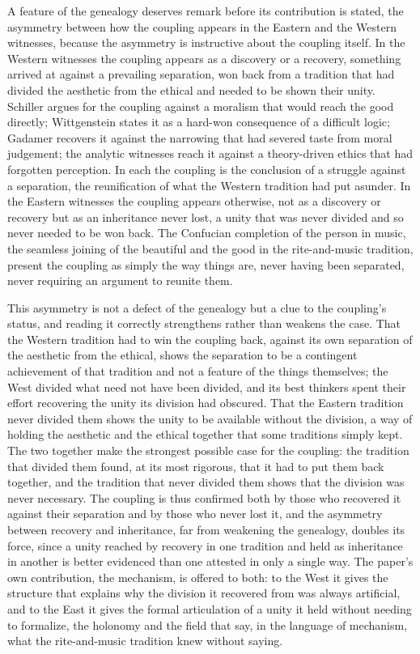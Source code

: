 A feature of the genealogy deserves remark before its contribution is stated, the asymmetry between how the coupling appears in the Eastern and the Western witnesses, because the asymmetry is instructive about the coupling itself. In the Western witnesses the coupling appears as a discovery or a recovery, something arrived at against a prevailing separation, won back from a tradition that had divided the aesthetic from the ethical and needed to be shown their unity. Schiller argues for the coupling against a moralism that would reach the good directly; Wittgenstein states it as a hard-won consequence of a difficult logic; Gadamer recovers it against the narrowing that had severed taste from moral judgement; the analytic witnesses reach it against a theory-driven ethics that had forgotten perception. In each the coupling is the conclusion of a struggle against a separation, the reunification of what the Western tradition had put asunder. In the Eastern witnesses the coupling appears otherwise, not as a discovery or recovery but as an inheritance never lost, a unity that was never divided and so never needed to be won back. The Confucian completion of the person in music, the seamless joining of the beautiful and the good in the rite-and-music tradition, present the coupling as simply the way things are, never having been separated, never requiring an argument to reunite them.

This asymmetry is not a defect of the genealogy but a clue to the coupling's status, and reading it correctly strengthens rather than weakens the case. That the Western tradition had to win the coupling back, against its own separation of the aesthetic from the ethical, shows the separation to be a contingent achievement of that tradition and not a feature of the things themselves; the West divided what need not have been divided, and its best thinkers spent their effort recovering the unity its division had obscured. That the Eastern tradition never divided them shows the unity to be available without the division, a way of holding the aesthetic and the ethical together that some traditions simply kept. The two together make the strongest possible case for the coupling: the tradition that divided them found, at its most rigorous, that it had to put them back together, and the tradition that never divided them shows that the division was never necessary. The coupling is thus confirmed both by those who recovered it against their separation and by those who never lost it, and the asymmetry between recovery and inheritance, far from weakening the genealogy, doubles its force, since a unity reached by recovery in one tradition and held as inheritance in another is better evidenced than one attested in only a single way. The paper's own contribution, the mechanism, is offered to both: to the West it gives the structure that explains why the division it recovered from was always artificial, and to the East it gives the formal articulation of a unity it held without needing to formalize, the holonomy and the field that say, in the language of mechanism, what the rite-and-music tradition knew without saying.

